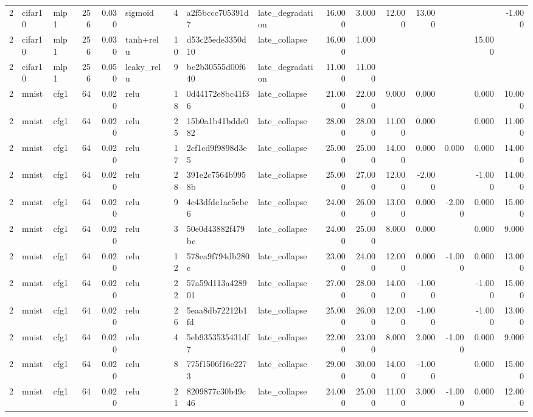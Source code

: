 \begin{table}[htbp]
{\begin{tabular}{@{}rllrrlrllrrrrrrr@{}}
2 & cifar10 & mlp1 & 256 & 0.030 & sigmoid & 4 & a2f5bccc705391d7 & late\_degradation & 16.000 & 3.000 & 12.000 & 13.000 &  &  & -1.000 \\
2 & cifar10 & mlp1 & 256 & 0.030 & tanh+relu & 10 & d53c25ede3350d10 & late\_collapse & 16.000 & 1.000 &  &  &  & 15.000 &  \\
2 & cifar10 & mlp1 & 256 & 0.050 & leaky\_relu & 9 & be2b30555d00f640 & late\_degradation & 11.000 & 11.000 &  &  &  &  &  \\
2 & mnist & cfg1 & 64 & 0.020 & relu & 18 & 0d44172e8bc41f36 & late\_collapse & 21.000 & 22.000 & 9.000 & 0.000 &  & 0.000 & 10.000 \\
2 & mnist & cfg1 & 64 & 0.020 & relu & 25 & 15b0a1b41bddc082 & late\_collapse & 28.000 & 28.000 & 11.000 & 0.000 &  & 0.000 & 11.000 \\
2 & mnist & cfg1 & 64 & 0.020 & relu & 17 & 2cf1cd9f9898d3e5 & late\_collapse & 25.000 & 25.000 & 14.000 & 0.000 & 0.000 & 0.000 & 14.000 \\
2 & mnist & cfg1 & 64 & 0.020 & relu & 28 & 391e2c7564b9958b & late\_collapse & 25.000 & 27.000 & 12.000 & -2.000 &  & -1.000 & 14.000 \\
2 & mnist & cfg1 & 64 & 0.020 & relu & 9 & 4c43dfde1ae5ebe6 & late\_collapse & 24.000 & 26.000 & 13.000 & 0.000 & -2.000 & 0.000 & 15.000 \\
2 & mnist & cfg1 & 64 & 0.020 & relu & 3 & 50e0d43882f479bc & late\_collapse & 24.000 & 25.000 & 8.000 & 0.000 &  & 0.000 & 9.000 \\
2 & mnist & cfg1 & 64 & 0.020 & relu & 12 & 578ea9f794db280c & late\_collapse & 23.000 & 24.000 & 12.000 & 0.000 & -1.000 & 0.000 & 13.000 \\
2 & mnist & cfg1 & 64 & 0.020 & relu & 22 & 57a59d113a428901 & late\_collapse & 27.000 & 28.000 & 14.000 & -1.000 &  & -1.000 & 15.000 \\
2 & mnist & cfg1 & 64 & 0.020 & relu & 26 & 5eaa8db72212b1fd & late\_collapse & 25.000 & 26.000 & 12.000 & -1.000 &  & -1.000 & 13.000 \\
2 & mnist & cfg1 & 64 & 0.020 & relu & 4 & 5eb9353535431df7 & late\_collapse & 22.000 & 23.000 & 8.000 & 2.000 & -1.000 & 0.000 & 9.000 \\
2 & mnist & cfg1 & 64 & 0.020 & relu & 8 & 775f1506f16c2273 & late\_collapse & 29.000 & 30.000 & 14.000 & -1.000 &  & 0.000 & 15.000 \\
2 & mnist & cfg1 & 64 & 0.020 & relu & 21 & 8209877c30b49c46 & late\_collapse & 24.000 & 25.000 & 11.000 & 3.000 & -1.000 & 0.000 & 12.000 \\

\end{tabular}}
\end{table}
